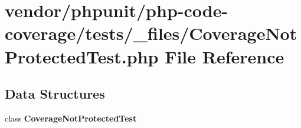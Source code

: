 \section{vendor/phpunit/php-\/code-\/coverage/tests/\+\_\+files/\+Coverage\+Not\+Protected\+Test.php File Reference}
\label{php-code-coverage_2tests_2__files_2_coverage_not_protected_test_8php}
\subsection*{Data Structures}
\begin{DoxyCompactItemize}
\item 
class {\bf Coverage\+Not\+Protected\+Test}
\end{DoxyCompactItemize}
